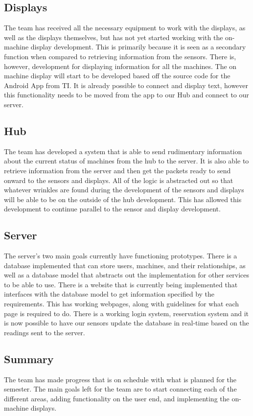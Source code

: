 \documentclass[letterpaper,11pt]{./templates/texMemo} %
\begin{document}
\subsection{Displays}
The team has received all the necessary equipment to work with the displays, as well as the displays themselves, but has not yet started working with the on-machine display development. This is primarily because it is seen as a secondary function when compared to retrieving information from the sensors. There is, however, development for displaying information for all the machines. The on machine display will start to be developed based off the source code for the Android App from TI. It is already possible to connect and display text, however this functionality needs to be moved from the app to our Hub and connect to our server.

\subsection{Hub}
The team has developed a system that is able to send rudimentary information about the current status of machines from the hub to the server. It is also able to retrieve information from the server and then get the packets ready to send onward to the sensors and displays. All of the logic is abstracted out so that whatever wrinkles are found during the development of the sensors and displays will be able to be on the outside of the hub development. This has allowed this development to continue parallel to the sensor and display development.

\subsection{Server}
The server's two main goals currently have functioning prototypes. There is a database implemented that can store users, machines, and their relationships, as well as a database model that abstracts out the implementation for other services to be able to use. There is a website that is currently being implemented that interfaces with the database model to get information specified by the requirements. This has working webpages, along with guidelines for what each page is required to do. There is a working login system, reservation system and it is now possible to have our sensors update the database in real-time based on the readings sent to the server.

\subsection{Summary}
The team has made progress that is on schedule with what is planned for the semester. The main goals left for the team are to start connecting each of the different areas, adding functionality on the user end, and implementing the on-machine displays.
\end{document}
